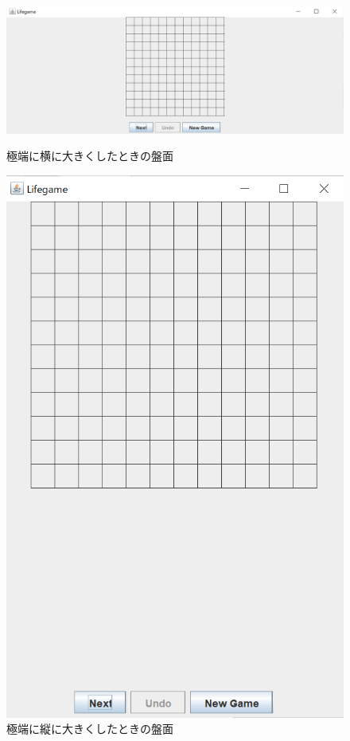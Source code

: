 \documentclass[dvipdfmx]{jarticle}
\begin{document}
\begin{figure}[htbp]
    \begin{minipage}[b]{0.45\linewidth}
      \centering
      \includegraphics[keepaspectratio, scale=0.3]{wide.png}
      \caption{極端に横に大きくしたときの盤面}
    \end{minipage}
    \begin{minipage}[b]{0.45\linewidth}
      \centering
      \includegraphics[keepaspectratio, scale=0.3]{height.png}
      \caption{極端に縦に大きくしたときの盤面}
    \end{minipage}
  \end{figure}
\end{document}
